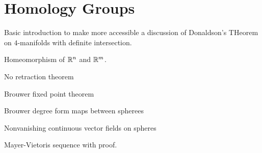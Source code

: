 \chapter{Homology Groups}

Basic introduction to make more accessible a discussion of Donaldson's THeorem on $4$-manifolds with definite intersection.

Homeomorphism of $\mathbb{R}^n$ and $\mathbb{R}^m$.

No retraction theorem

Brouwer fixed point theorem

Brouwer degree form maps between spherees

Nonvanishing continuous vector fields on spheres

Mayer-Vietoris sequence with proof.